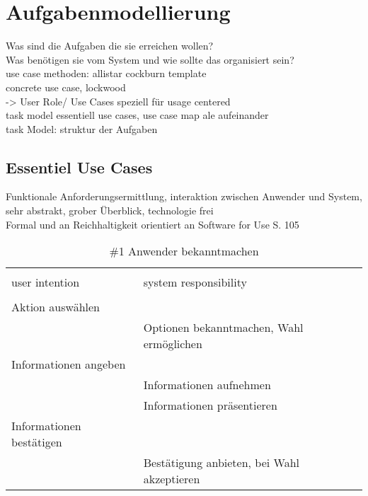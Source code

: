 
\section{Aufgabenmodellierung}

Was sind die Aufgaben die sie erreichen wollen?\\
Was benötigen sie vom System und wie sollte das organisiert sein?\\

use case methoden: allistar cockburn template \\
concrete use case, lockwood\\


-> User Role/ Use Cases speziell für usage centered	\\
task model essentiell use cases, use case map ale aufeinander\\

task Model: struktur der Aufgaben\\


\subsection{Essentiel Use Cases}
Funktionale Anforderungsermittlung, interaktion zwischen Anwender und System, sehr abstrakt, grober Überblick, technologie frei\\
Formal und an Reichhaltigkeit orientiert an Software for Use S. 105

\begin{table}[H]
\caption{\#1 Anwender bekanntmachen }
\centering
\begin{tabular}{l l}
\\ [-0.5ex]

\hline\hline
\\ [-0.5ex]
user intention & system responsibility
\\ [1.5ex]
\hline
\\ [-0.5ex]
Aktion auswählen 			& 											\\[1ex]
							& Optionen bekanntmachen, Wahl ermöglichen	\\[1ex]
Informationen angeben 		& 											\\[1ex] 
							& Informationen aufnehmen					\\[1ex]
							& Informationen präsentieren				\\[1ex]
Informationen bestätigen	& 											\\[1ex]
							& Bestätigung anbieten, bei Wahl akzeptieren \\[1ex]


\hline
\end{tabular}
\label{tab:anmelden}
\end{table}

